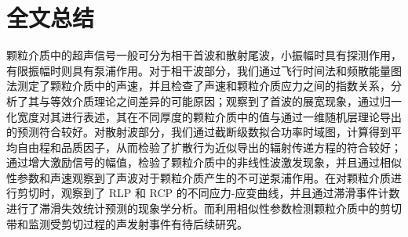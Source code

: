 
\chapter{全文总结}

颗粒介质中的超声信号一般可分为相干首波和散射尾波，小振幅时具有探测作用，有限振幅时则具有泵浦作用。对于相干波部分，我们通过飞行时间法和频散能量图法测定了颗粒介质中的声速，并且检查了声速和颗粒介质应力之间的指数关系，分析了其与等效介质理论之间差异的可能原因；观察到了首波的展宽现象，通过归一化宽度对其进行表述，其在不同厚度的颗粒介质中的值与通过一维随机层理论导出的预测符合较好。对散射波部分，我们通过截断级数拟合功率时域图，计算得到平均自由程和品质因子，从而检验了扩散行为近似导出的辐射传递方程的符合较好；通过增大激励信号的幅值，检验了颗粒介质中的非线性波激发现象，并且通过相似性参数和声速观察到了声波对于颗粒介质产生的不可逆泵浦作用。在对颗粒介质进行剪切时，观察到了 RLP 和 RCP 的不同应力-应变曲线，并且通过滞滑事件计数进行了滞滑失效统计预测的现象学分析。而利用相似性参数检测颗粒介质中的剪切带和监测受剪切过程的声发射事件有待后续研究。